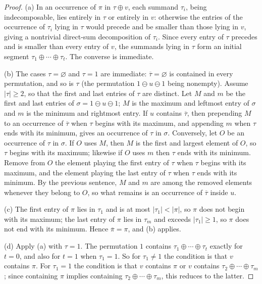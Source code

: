 \documentclass[11pt]{amsart}
\theoremstyle{definition}
\newcommand{\ds}{\oplus}
\newcommand{\sk}{\ominus}
\newcommand{\red}[1]{\overline{#1}}
\begin{document}
\begin{proof}
(a) In an occurrence of $\pi$ in $\tau\ds v$, each summand $\tau_i$, being indecomposable, lies entirely in $\tau$ or entirely in $v$: otherwise the entries of the occurrence of $\tau_i$ lying in $\tau$ would precede and be smaller than those lying in $v$, giving a nontrivial direct-sum decomposition of $\tau_i$. Since every entry of $\tau$ precedes and is smaller than every entry of $v$, the summands lying in $\tau$ form an initial segment $\tau_1\ds\cdots\ds\tau_t$. The converse is immediate.

(b) The cases $\tau=\varnothing$ and $\tau=1$ are immediate: $\red\tau=\varnothing$ is contained in every permutation, and so is $\tau$ (the permutation $1\sk u\sk1$ being nonempty). Assume $|\tau|\ge2$, so that the first and last entries of $\tau$ are distinct. Let $M$ and $m$ be the first and last entries of $\sigma=1\sk u\sk1$; $M$ is the maximum and leftmost entry of $\sigma$ and $m$ is the minimum and rightmost entry. If $u$ contains $\red\tau$, then prepending $M$ to an occurrence of $\red\tau$ when $\tau$ begins with its maximum, and appending $m$ when $\tau$ ends with its minimum, gives an occurrence of $\tau$ in $\sigma$. Conversely, let $O$ be an occurrence of $\tau$ in $\sigma$. If $O$ uses $M$, then $M$ is the first and largest element of $O$, so $\tau$ begins with its maximum; likewise if $O$ uses $m$ then $\tau$ ends with its minimum. Remove from $O$ the element playing the first entry of $\tau$ when $\tau$ begins with its maximum, and the element playing the last entry of $\tau$ when $\tau$ ends with its minimum. By the previous sentence, $M$ and $m$ are among the removed elements whenever they belong to $O$, so what remains is an occurrence of $\red\tau$ inside $u$.

(c) The first entry of $\pi$ lies in $\tau_1$ and is at most $|\tau_1|<|\pi|$, so $\pi$ does not begin with its maximum; the last entry of $\pi$ lies in $\tau_m$ and exceeds $|\tau_1|\ge1$, so $\pi$ does not end with its minimum. Hence $\red\pi=\pi$, and (b) applies.

(d) Apply (a) with $\tau=1$. The permutation $1$ contains $\tau_1\ds\cdots\ds\tau_t$ exactly for $t=0$, and also for $t=1$ when $\tau_1=1$. So for $\tau_1\ne1$ the condition is that $v$ contains $\pi$. For $\tau_1=1$ the condition is that $v$ contains $\pi$ or $v$ contains $\tau_2\ds\cdots\ds\tau_m$; since containing $\pi$ implies containing $\tau_2\ds\cdots\ds\tau_m$, this reduces to the latter.
\end{proof}
\end{document}
